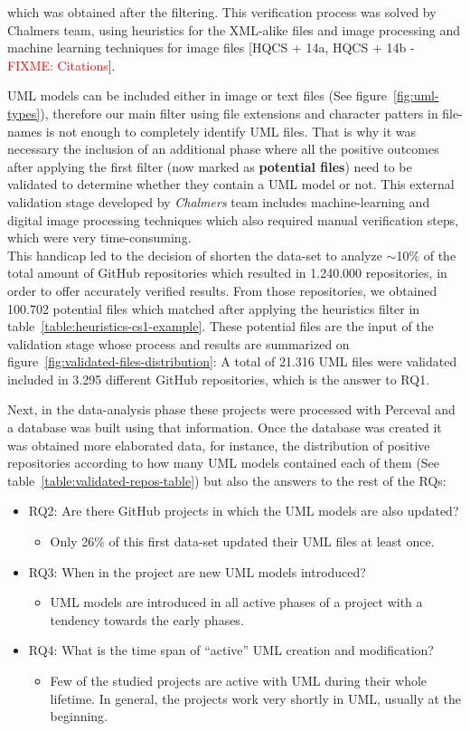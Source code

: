 \documentclass[a4paper, 12pt]{book}
\begin{document}
which was obtained after the filtering. This verification process was solved by Chalmers team, using heuristics for the XML-alike files
and image processing and machine learning techniques for image files [HQCS + 14a, HQCS + 14b - \textcolor{red}{FIXME: Citations}].\par
UML models can be included either in image or text files (See figure~\ref{fig:uml-types}), therefore our main filter using file extensions
and character patters in file-names is not enough to completely identify UML files. That is why it was necessary the inclusion of
an additional phase where all the positive outcomes after applying the first filter (now marked as \textbf{potential files}) need
to be validated to determine whether they contain a UML model or not. This external validation stage developed by \emph{Chalmers} team
includes machine-learning and digital image processing techniques which also required manual verification steps, which were very time-consuming.\\
This handicap led to the decision of shorten the data-set to analyze $\sim$10\% of the total amount of GitHub repositories which resulted
in 1.240.000 repositories, in order to offer accurately verified results. From those repositories, we obtained 100.702 potential files
which matched after applying the heuristics filter in table~\ref{table:heuristics-cs1-example}. These potential files are the input
of the validation stage whose process and results are summarized on figure~\ref{fig:validated-files-distribution}: A total of 21.316 UML
files were validated included in 3.295 different GitHub repositories, which is the answer to RQ1.\par
Next, in the data-analysis phase these projects were processed with Perceval and a database was built using that information.
Once the database was created it was obtained more elaborated data, for instance, the distribution of positive repositories
according to how many UML models contained each of them (See table~\ref{table:validated-repos-table}) but also the answers to the rest
of the RQs:
\begin{itemize}
  \item RQ2: Are there GitHub projects in which the UML models are also updated?
  \begin{itemize}
    \item Only 26\% of this first data-set updated their UML files at least once.
  \end{itemize}
  \item RQ3: When in the project are new UML models introduced?
  \begin{itemize}
    \item UML models are introduced in all active phases of a project with a tendency towards the early phases.
  \end{itemize}
  \item RQ4: What is the time span of ``active'' UML creation and modification?
  \begin{itemize}
    \item Few of the studied projects are active with UML during their whole lifetime.
    In general, the projects work very shortly in UML, usually at the beginning.
  \end{itemize}
\end{itemize}
\end{document}
